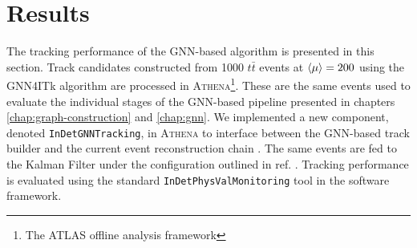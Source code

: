 \section{Results}
\label{sect:track-performance}

The tracking performance of the GNN-based algorithm is presented in this section. 
Track candidates constructed from 1000 $t\bar{t}$ events at $\expval{\mu}=200$ using the GNN4ITk algorithm are processed in \textsc{Athena}\footnote{The ATLAS offline analysis framework}. 
These are the same events used to evaluate the individual stages of the GNN-based pipeline presented in chapters \ref{chap:graph-construction} and \ref{chap:gnn}. 
We implemented a new component, denoted \texttt{InDetGNNTracking}, in \textsc{Athena} to interface between the GNN-based track builder and the current event reconstruction chain \cite{atlas_collaboration_2021_4772550}.
The same events are fed to the Kalman Filter under the configuration outlined in ref. \cite{Aad_2025}.
Tracking performance is evaluated using the standard \texttt{InDetPhysValMonitoring} tool in the software framework.

